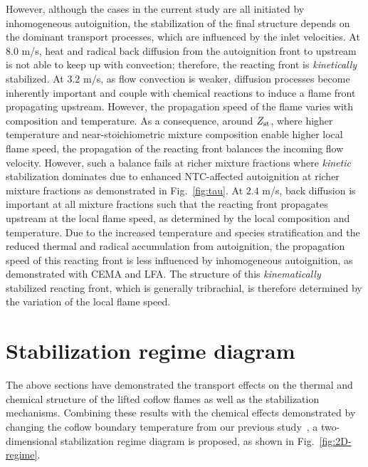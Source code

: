 \documentclass[review,3p,times]{elsarticle}
\begin{document}
However, although the cases in the current study are all initiated by inhomogeneous autoignition, the stabilization of the final structure depends on the dominant transport processes, which are influenced by the inlet velocities.  At $8.0$ m/s, heat and radical back diffusion from the autoignition front to upstream is not able to keep up with convection; therefore, the reacting front is \emph{kinetically} stabilized.  At $3.2$ m/s, as flow convection is weaker, diffusion processes become inherently important and couple with chemical reactions to induce a flame front propagating upstream.  However, the propagation speed of the flame varies with composition and temperature.  As a consequence, around $Z_{\rm st}$, where higher temperature and near-stoichiometric mixture composition enable higher local flame speed, the propagation of the reacting front balances the incoming flow velocity.  However, such a balance fails at richer mixture fractions where \emph{kinetic} stabilization dominates due to enhanced NTC-affected autoignition at richer mixture fractions as demonstrated in Fig.~\ref{fig:tau}.  At $2.4$ m/s, back diffusion is important at all mixture fractions such that the reacting front propagates upstream at the local flame speed, as determined by the local composition and temperature.  Due to the increased temperature and species stratification and the reduced thermal and radical accumulation from autoignition, the propagation speed of this reacting front is less influenced by inhomogeneous autoignition, as demonstrated with CEMA and LFA.  The structure of this \emph{kinematically} stabilized reacting front, which is generally tribrachial, is therefore determined by the variation of the local flame speed. 


       
\section{Stabilization regime diagram}

The above sections have demonstrated the transport effects on the thermal and chemical structure of the lifted coflow flames as well as the stabilization mechanisms.  Combining these results with the chemical effects demonstrated by changing the coflow boundary temperature from our previous study~\cite{deng15}, a two-dimensional stabilization regime diagram is proposed, as shown in Fig.~\ref{fig:2D-regime}.   
\end{document}
